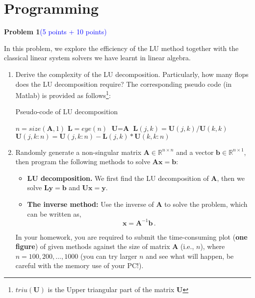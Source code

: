 \documentclass[english,onecolumn]{IEEEtran}
\begin{document}
\clearpage

\section{Programming}

\noindent\textbf{Problem 1}\textcolor{blue}{(5 points + 10 points)}

In this problem, we explore  the efficiency of the LU method together with the classical linear system solvers we have learnt in linear algebra. 

\begin{enumerate}
	\item Derive the complexity of the LU decomposition. Particularly, how many flops does the LU decomposition require? The corresponding pseudo code (in {\sf Matlab}) is provided as follows\footnote{$triu(\textbf{U})$ is the Upper triangular part of the matrix $\textbf{U}$}: 
	
\begin{algorithm}[htb]
  \caption{ Pseudo-code of LU decomposition}
  \begin{algorithmic}[1]
    \State $n = size(\textbf{A},1)$
    \State $\textbf{L} = eye(n)$
    \State $\textbf{U} = \textbf{A} $
            \State $\textbf{L}(j,k)=\textbf{U}(j,k)/\textbf{U}(k,k)$
            \State $\textbf{U}(j,k:n)=\textbf{U}(j,k:n)-\textbf{L}(j,k)*\textbf{U}(k,k:n)$
        \EndFor
    \EndFor
    \EndFunction
     
  \end{algorithmic}
\end{algorithm}

\item Randomly generate a non-singular matrix $\mathbf{A}\in\mathbb{R}^{n\times n}$ and a vector $\mathbf{b}\in\mathbb{R}^{n\times 1}$, then program the following  methods to solve $\mathbf{Ax=b}$: 
\begin{itemize}
  \item {\bf LU decomposition.} We first find the LU decomposition of $\mathbf{A}$, then we solve $\mathbf{L}\mathbf{y}=\mathbf{b}$ and $\mathbf{U}\mathbf{x}=\mathbf{y}$.
  
  \item {\bf The inverse method:} Use the inverse of $\mathbf{A}$ to solve the problem, which can be written as,
      \[
      \mathbf{x}=\mathbf{A}^{-1}\mathbf{b}\,.
      \]
\end{itemize}
In your homework, you are required to submit the time-consuming plot (\textbf{one figure}) of given methods against the size of matrix $\mathbf{A}$ (i.e., $n$), where $n=100, 200,\dots, 1000$ (you can try larger $n$ and see what will happen, be careful with the memory use of your PC!). 


\end{enumerate}
\end{document}
